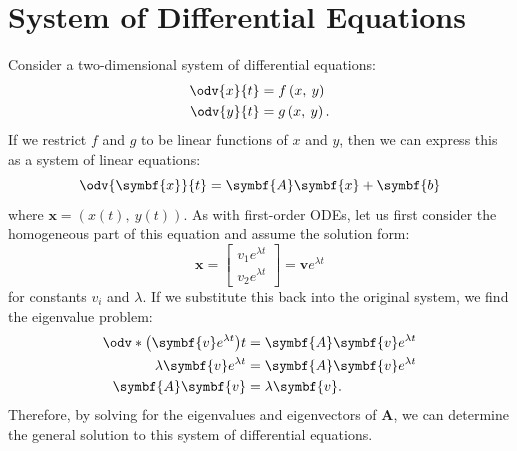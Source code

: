 \documentclass{article}
\begin{document}
\section{System of Differential Equations}
Consider a two-dimensional system of differential equations:
\begin{align*}
    \odv{x}{t} & = f\left( x,\: y \right)  \\
    \odv{y}{t} & = g\left( x,\: y \right).
\end{align*}
If we restrict \(f\) and \(g\) to be linear functions of \(x\) and \(y\),
then we can express this as a system of linear equations:
\begin{equation*}
    \odv{\symbf{x}}{t} = \symbf{A} \symbf{x} + \symbf{b}
\end{equation*}
where \(\symbf{x} = \left( x\left( t \right),\: y\left( t \right) \right)\).
As with first-order ODEs, let us first consider the homogeneous part of
this equation and assume the solution form:
\begin{equation*}
    \symbf{x} =
    \begin{bmatrix}
        v_1 e^{\lambda t} \\
        v_2 e^{\lambda t}
    \end{bmatrix}
    = \symbf{v} e^{\lambda t}
\end{equation*}
for constants \(v_i\) and \(\lambda\). If we substitute this back into
the original system, we find the eigenvalue problem:
\begin{align*}
    \odv*{\left( \symbf{v} e^{\lambda t} \right)}{t} & = \symbf{A} \symbf{v} e^{\lambda t} \\
    \lambda \symbf{v} e^{\lambda t}                  & = \symbf{A} \symbf{v} e^{\lambda t} \\
    \symbf{A} \symbf{v}                              & = \lambda \symbf{v}.
\end{align*}
Therefore, by solving for the eigenvalues and eigenvectors of \(\symbf{A}\),
we can determine the general solution to this system of differential
equations.
\end{document}
